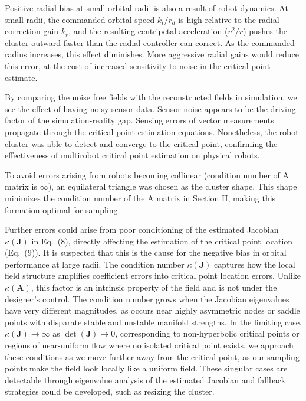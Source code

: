 \documentclass[lettersize,journal]{IEEEtran}
\begin{document}
Positive radial bias at small orbital radii is also a result of robot dynamics. At small radii, the commanded orbital speed $k_t / r_d$ is high relative to the radial correction gain $k_r$, and the resulting centripetal acceleration ($v^2 / r$) pushes the cluster outward faster than the radial controller can correct. As the commanded radius increases, this effect diminishes. More aggressive radial gains would reduce this error, at the cost of increased sensitivity to noise in the critical point estimate.

By comparing the noise free fields with the reconstructed fields in simulation, we see the effect of having noisy sensor data. Sensor noise appears to be the driving factor of the simulation-reality gap. Sensing errors of vector measurements propagate through the critical point estimation equations. Nonetheless, the robot cluster was able to detect and converge to the critical point, confirming the effectiveness of multirobot critical point estimation on physical robots.

To avoid errors arising from robots becoming collinear (condition number of A matrix is $\infty$), an equilateral triangle was chosen as the cluster shape. This shape minimizes the condition number of the A matrix in Section II, making this formation optimal for sampling.

Further errors could arise from poor conditioning of the estimated Jacobian $\kappa(\mathbf{J})$ in Eq.~(8), directly affecting the estimation of the critical point location (Eq.~(9)). It is suspected that this is the cause for the negative bias in orbital performance at large radii. The condition number $\kappa(\mathbf{J})$ captures how the local field structure amplifies coefficient errors into critical point location errors. Unlike $\kappa(\mathbf{A})$, this factor is an intrinsic property of the field and is not under the designer's control. The condition number grows when the Jacobian eigenvalues have very different magnitudes, as occurs near highly asymmetric nodes or saddle points with disparate stable and unstable manifold strengths. In the limiting case, $\kappa(\mathbf{J}) \to \infty$ as $\det(\mathbf{J}) \to 0$, corresponding to non-hyperbolic critical points or regions of near-uniform flow where no isolated critical point exists, we approach these conditions as we move further away from the critical point, as our sampling points make the field look locally like a uniform field. These singular cases are detectable through eigenvalue analysis of the estimated Jacobian and fallback strategies could be developed, such as resizing the cluster.
\end{document}
